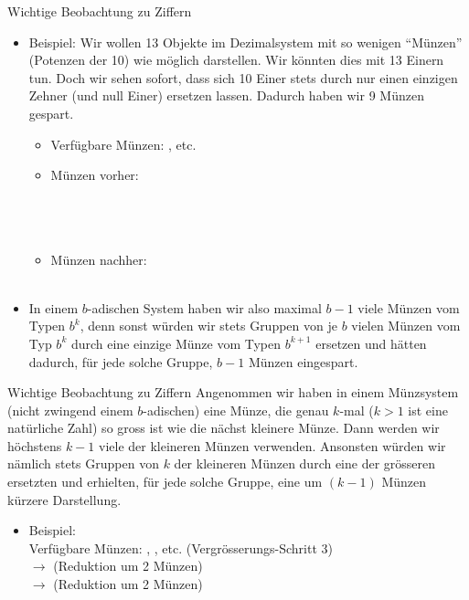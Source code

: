\begin{frame}{Wichtige Beobachtung zu Ziffern}
\begin{itemize}[<+->]
\item Beispiel: Wir wollen 13 Objekte im Dezimalsystem mit so wenigen \enquote{Münzen} (Potenzen der 10) wie möglich darstellen. Wir könnten dies mit 13 Einern tun. Doch wir sehen sofort, dass sich 10 Einer stets durch nur einen einzigen Zehner (und null Einer) ersetzen lassen. Dadurch haben wir 9 Münzen gespart.
\begin{itemize}
    \item Verfügbare Münzen: ,  etc.
    \item Münzen vorher:\\
    \\
    \\
    \\
    \item Münzen nachher:\\
    \\
\end{itemize}
\item In einem $b$-adischen System haben wir also maximal $b-1$ viele Münzen vom Typen $b^k$, denn sonst würden wir stets Gruppen von je $b$ vielen Münzen vom Typ $b^k$ durch eine einzige Münze vom Typen $b^{k+1}$ ersetzen und hätten dadurch, für jede solche Gruppe, $b-1$ Münzen eingespart.
\end{itemize}

\end{frame}


\begin{frame}{Wichtige Beobachtung zu Ziffern}
Angenommen wir haben in einem Münzsystem (nicht zwingend einem $b$-adischen) eine Münze, die genau $k$-mal ($k>1$ ist eine natürliche Zahl) so gross ist wie die nächst kleinere Münze. Dann werden wir höchstens $k-1$ viele der kleineren Münzen verwenden. Ansonsten würden wir nämlich stets Gruppen von $k$ der kleineren Münzen durch eine der grösseren ersetzten und erhielten, für jede solche Gruppe, eine um $(k-1)$ Münzen kürzere Darstellung.
\begin{itemize}
    \item Beispiel:\\
    Verfügbare Münzen: , ,  etc. (Vergrösserungs-Schritt 3)\\
     $\rightarrow$  (Reduktion um 2 Münzen)\\
     $\rightarrow$  (Reduktion um 2 Münzen)
\end{itemize}
\end{frame}

